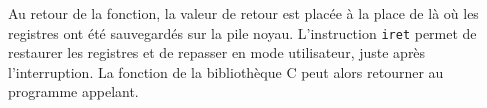 Au retour de la fonction, la valeur de retour est placée à la place de \eax là
où les registres ont été sauvegardés sur la pile noyau. L'instruction
\texttt{iret} permet de restaurer les registres et de repasser en mode
utilisateur, juste après l'interruption. La fonction de la bibliothèque C peut
alors retourner au programme appelant.

